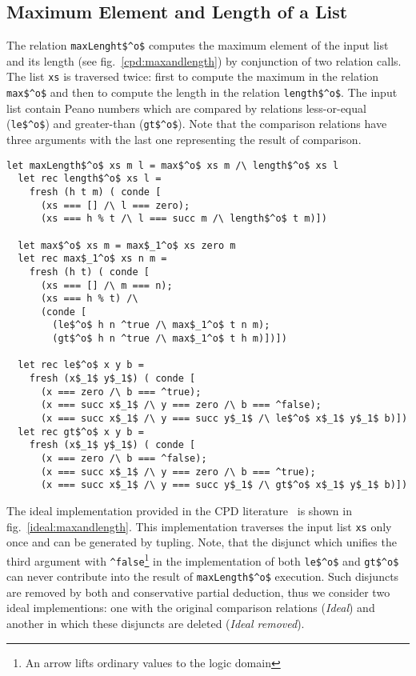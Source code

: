 \subsection{Maximum Element and Length of a List}

The relation \lstinline{maxLenght$^o$} computes the maximum element of the input list and its length (see fig.~\ref{cpd:maxandlength}) by conjunction of two relation calls.
The list \lstinline{xs} is traversed twice: first to compute the maximum in the relation \lstinline{max$^o$} and then to compute the length in the relation \lstinline{length$^o$}.
The input list contain Peano numbers which are compared by relations less-or-equal (\lstinline{le$^o$}) and greater-than (\lstinline{gt$^o$}).
Note that the comparison relations have three arguments with the last one representing the result of comparison.

\begin{figure*}[!h]
  \centering
  \begin{minipage}{0.85\textwidth}
\begin{lstlisting}[label={cpd:maxandlength}, caption={Maximum element and length of the list}, captionpos=b, frame=tb]
  let maxLength$^o$ xs m l = max$^o$ xs m /\ length$^o$ xs l
  let rec length$^o$ xs l =
    fresh (h t m) ( conde [
      (xs === [] /\ l === zero);
      (xs === h % t /\ l === succ m /\ length$^o$ t m)])

  let max$^o$ xs m = max$_1^o$ xs zero m
  let rec max$_1^o$ xs n m =
    fresh (h t) ( conde [
      (xs === [] /\ m === n);
      (xs === h % t) /\
      (conde [
        (le$^o$ h n ^true /\ max$_1^o$ t n m);
        (gt$^o$ h n ^true /\ max$_1^o$ t h m)])])

  let rec le$^o$ x y b =
    fresh (x$_1$ y$_1$) ( conde [
      (x === zero /\ b === ^true);
      (x === succ x$_1$ /\ y === zero /\ b === ^false);
      (x === succ x$_1$ /\ y === succ y$_1$ /\ le$^o$ x$_1$ y$_1$ b)])
  let rec gt$^o$ x y b =
    fresh (x$_1$ y$_1$) ( conde [
      (x === zero /\ b === ^false);
      (x === succ x$_1$ /\ y === zero /\ b === ^true);
      (x === succ x$_1$ /\ y === succ y$_1$ /\ gt$^o$ x$_1$ y$_1$ b)])
  \end{lstlisting}
\end{minipage}
\end{figure*}

The ideal implementation provided in the CPD literature~\cite{de1999conjunctive} is shown in fig.~\ref{ideal:maxandlength}.
This implementation traverses the input list \lstinline{xs} only once and can be generated by tupling.
Note, that the disjunct which unifies the third argument with \lstinline{^false}\footnote{An arrow lifts ordinary values to the logic domain} in the implementation of both \lstinline{le$^o$} and \lstinline{gt$^o$} can never contribute into the result of \lstinline{maxLength$^o$} execution.
Such disjuncts are removed by both \ecce and conservative partial deduction, thus we consider two ideal implementions: one with the original comparison relations (\emph{Ideal}) and another in which these disjuncts are deleted (\emph{Ideal removed}).

